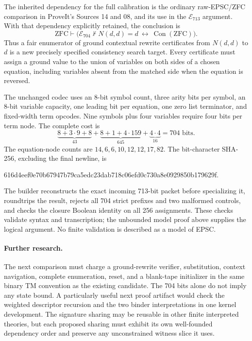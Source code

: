 The inherited dependency for the full calibration is the ordinary
raw-EPSC/ZFC comparison in ProveIt's Sources 14 and 08, and its use in
the $\mathcal E_{713}$ argument.  With that dependency explicitly
retained, the conclusion is
\[
 \mathrm{ZFC}\vdash
 \bigl(\mathcal E_{704}\nvdash N(d,d)=d
             \ \longleftrightarrow\ \operatorname{Con}(\mathrm{ZFC})\bigr).
\]
Thus a fair enumerator of ground contextual rewrite certificates
from $N(d,d)$ to $d$ is a new precisely specified consistency search
target.  Every certificate must assign a ground value to the union
of variables on both sides of a chosen equation, including variables
absent from the matched side when the equation is reversed.

The unchanged codec uses an 8-bit symbol count, three arity bits per
symbol, an 8-bit variable capacity, one leading bit per equation,
one zero list terminator, and fixed-width term opcodes.  Nine symbols
plus four variables require four bits per term node.  The complete
cost is
\[
 \underbrace{8+3\cdot9+8}_{43}
 +\underbrace{8+1+4\cdot159}_{645}
 +\underbrace{4\cdot4}_{16}
 =\boxed{704\text{ bits}}.
\]
The equation-node counts are $14,6,6,10,12,12,17,82$.  The bit-character
SHA-256, excluding the final newline, is
\begin{center}\scriptsize\ttfamily
616d4eef0e70b67947b79ca5edc23dab718c06efd0c730a8e0929850b179629f.
\end{center}
The builder reconstructs the exact incoming 713-bit packet before
specializing it, roundtrips the result, rejects all 704 strict
prefixes and two malformed controls, and checks the closure Boolean
identity on all 256 assignments.  These checks validate syntax and
transcription; the unbounded model proof above supplies the logical
argument.  No finite validation is described as a model of EPSC.

\paragraph{Further research.}
The next comparison must charge a ground-rewrite verifier, substitution,
context navigation, complete enumeration, reset, and a blank-tape
initializer in the same binary TM convention as the existing candidate.
The 704 bits alone do not imply any state bound.  A particularly useful
next proof artifact would check the weighted descriptor recursion and
the two binder interpretations in one kernel development.  The
signature sharing may be reusable in other finite interpreted theories,
but each proposed sharing must exhibit its own well-founded dependency
order and preserve any unconstrained witness slice it uses.

